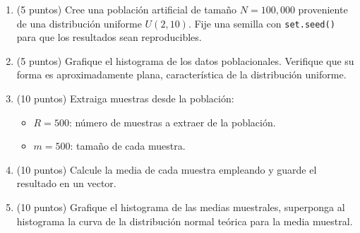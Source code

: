 \documentclass[letterpaper,11pt]{article}
\begin{document}
\begin{enumerate}
    \item (5 puntos)   
    Cree una población artificial de tamaño $N=100{,}000$ proveniente de una distribución uniforme $U(2,10)$.   
    Fije una semilla con \texttt{set.seed()} para que los resultados sean reproducibles.

    \item (5 puntos)
    Grafique el histograma de los datos poblacionales. Verifique que su forma es aproximadamente plana, característica de la distribución uniforme.

     \item (10 puntos) Extraiga muestras desde la población:  


 \begin{itemize}
        \item $R = 500$: número de muestras a extraer de la población.
        \item $m = 500$: tamaño de cada muestra.
    \end{itemize}


    \item  (10 puntos)
    Calcule la media de cada muestra empleando  y guarde el resultado en un vector.

    \item (10 puntos)
    Grafique el histograma de las medias muestrales, superponga al histograma la curva de la distribución normal teórica para la media muestral.


\end{enumerate}
\end{document}
